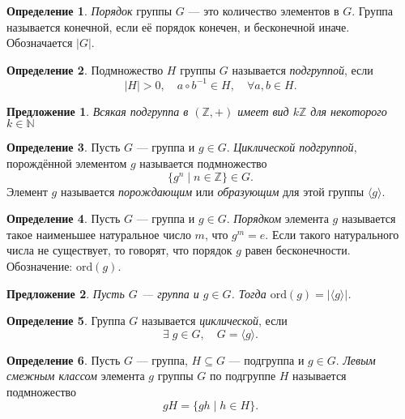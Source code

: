 \documentclass[a4paper]{article}
\theoremstyle{plain}
\newtheorem{proposal}{Предложение}
\theoremstyle{definition}
\newtheorem{definition}{Определение}
\numberwithin{definition}{section}
\numberwithin{proposal}{section}
\begin{document}
\begin{definition}
\emph{Порядок} группы \(G\) --- это количество элементов в \(G\). Группа называется конечной, если её порядок конечен, и бесконечной иначе. Обозначается \(|G|\).
\end{definition}

\begin{definition}
Подмножество \(H\) группы \(G\) называется \emph{подгруппой}, если
\begin{equation*}
 	|H| > 0, \quad a \circ b^{-1} \in H, \quad \forall a,b \in H.
\end{equation*}
\end{definition}

\begin{proposal}
Всякая подгруппа в \((\mathbb{Z}, +)\) имеет вид \(k\mathbb{Z}\) для некоторого \(k \in \mathbb{N}\)
\end{proposal}

\begin{definition}
Пусть \(G\) --- группа и \(g \in G\). \emph{Циклической подгруппой}, порождённой элементом \(g\) называется подмножество
\begin{equation*}
	\{g^n \;|\; n \in \mathbb{Z}\} \in G.
\end{equation*}
Элемент \(g\) называется \emph{порождающим} или \emph{образующим} для этой группы \(\langle g \rangle\).
\end{definition}

\begin{definition}
Пусть \(G\) --- группа и \(g \in G\). \emph{Порядком} элемента \(g\) называется такое наименьшее натуральное число \(m\), что \(g^m = e\). Если такого натурального числа не существует, то говорят, что порядок \(g\) равен бесконечности. Обозначение: \(\mathrm{ord}(g)\).
\end{definition}

\begin{proposal}
Пусть \(G\) --- группа и \(g \in G\). Тогда \(\mathrm{ord}(g) = |\langle g \rangle|\).
\end{proposal}

\begin{definition}
Группа \(G\) называется \emph{циклической}, если 
\begin{equation*}
	\exists \; g \in G, \quad G = \langle g \rangle.
\end{equation*}
\end{definition}

\begin{definition}
Пусть \(G\) --- группа, \(H \subseteq G\) --- подгруппа и \(g \in G\). \emph{Левым смежным классом} элемента \(g\) группы \(G\) по подгруппе \(H\) называется подмножество
\begin{equation*}
	gH = \{gh \;|\; h \in H\}.
\end{equation*}
\end{definition}
\end{document}
